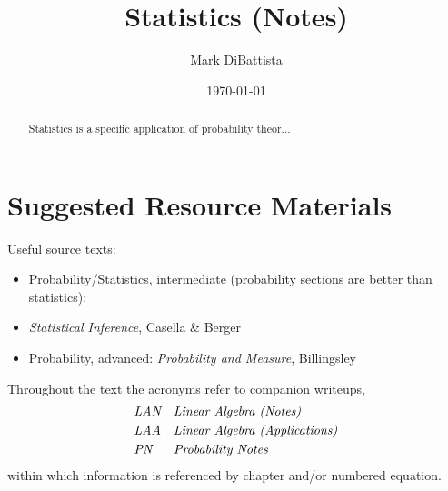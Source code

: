 \documentclass[12pt, twoside, draft]{article}
\begin{document}
\setpagewiselinenumbers


\title{Statistics (Notes)}

\footnotesize\date{\today}

\author{Mark DiBattista}

\maketitle

\begin{abstract}
Statistics is a specific application of  probability theor...

\end{abstract}


\section{Suggested Resource Materials}
Useful source texts:

\begin{itemize}[noitemsep]
\item Probability/Statistics, intermediate (probability sections are better than statistics):\hspace{50pt}
\item[] \hspace{200pt} \textit{Statistical Inference}, Casella \& Berger
\item Probability, advanced: \hspace{98pt} \textit{Probability and Measure}, Billingsley
\end{itemize}

Throughout the text the acronyms refer to companion writeups,
\begin{align}
&\textit{LAN} \hspace{10pt} \textit{Linear Algebra (Notes)} \notag \\
&\textit{LAA} \hspace{10pt} \textit{Linear Algebra (Applications)} \notag \\
&\textit{PN} \hspace{17pt} \textit{Probability Notes} \notag
\end{align}
within which information is referenced by chapter and/or numbered equation.
\end{document}
